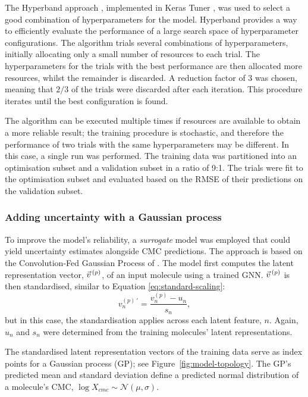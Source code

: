 The Hyperband approach \cite{liHyperbandNovelBanditBased2018}, implemented in Keras Tuner \cite{cholletKeras2015}, was used to select a good combination of hyperparameters for the model. Hyperband provides a way to efficiently evaluate
the performance of a large search space of hyperparameter configurations. The algorithm trials several combinations of hyperparameters, initially allocating only a small number of resources to each trial. The hyperparameters for the
trials with the best performance are then allocated more resources, whilst the remainder is discarded. A reduction factor of 3 was chosen, meaning that $2/3$ of the trials were discarded after each iteration. This procedure iterates until the best configuration is found.

The algorithm can be executed multiple times if resources are available to obtain a more reliable result; the training procedure is stochastic, and therefore the performance of two trials with the same hyperparameters may be different. In this case, a single run was performed. The training data was partitioned into an optimisation subset and a validation subset in a ratio of 9:1. The trials were fit to the optimisation subset and evaluated based on the RMSE of their predictions on the validation subset.

\subsubsection{Adding uncertainty with a Gaussian process}

To improve the model's reliability, a \emph{surrogate} model was employed that could yield uncertainty estimates alongside CMC predictions. The approach is based on the Convolution-Fed Gaussian Process of \citet{tranMethodsComparingUncertainty2020}. The model first computes the latent representation vector, $\vec{v}^{\,(p)}{}$, of an input molecule using a trained GNN. $\vec{v}^{\,(p)}{}$ is then standardised, similar to Equation \ref{eq:standard-scaling}:
\begin{equation}
    v^{(p)\,\prime}_n = \frac{v^{(p)}_n - u_n}{s_n},
\end{equation}
but in this case, the standardisation applies across each latent feature, $n$.
Again, $u_n$ and $s_n$ were determined from the training molecules' latent representations.

The standardised latent representation vectors of the training data serve as index points for a Gaussian process (GP); see Figure~\ref{fig:model-topology}.
The GP's predicted mean and standard deviation define a predicted normal distribution of a molecule's CMC, $\log X_{cmc} \sim \mathcal{N}(\mu, \sigma)$.

